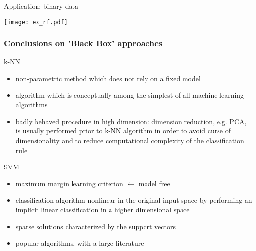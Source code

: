   \begin{frame}{Application: binary data}
    \begin{center}
    \texttt{[image: ex\_rf.pdf]}
  \end{center}
  \end{frame}
  
  \begin{frame}
  \frametitle{Conclusions on 'Black Box' approaches}
  
   \begin{block}{k-NN}
   \begin{itemize}
    \item non-parametric method which does not rely on a fixed model 
    \item algorithm which is conceptually  among the simplest of all machine learning algorithms
    \item badly behaved procedure in high dimension: dimension reduction, e.g. PCA, is usually performed prior to k-NN algorithm in order to avoid curse of dimensionality and to reduce computational complexity of the classification rule
   \end{itemize}

    
   \end{block}

  
  \begin{block}{SVM}
  \begin{itemize}
   \item maximum margin learning criterion $\leftarrow$ model free
   \item classification algorithm nonlinear in the original input space by performing an implicit linear classification
   in a higher dimensional space
   \item sparse solutions characterized by the support vectors
   \item popular algorithms, with a large literature 
    \end{itemize}
 \end{block} 

\end{frame}


